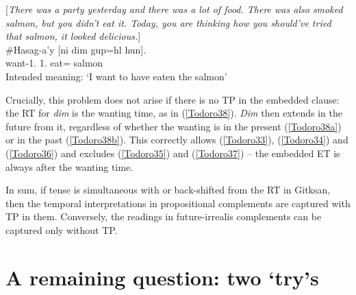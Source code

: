 \documentclass[output=paper]{langscibook}
\begin{document}
\begin{exe}
\ex \label{Todoro37}
\begin{xlist}

\ex \label{Todoro37a} [\emph{There was a party yesterday and there was a lot of food. There   
     was also smoked salmon, but you didn’t eat it. Today, you are thinking how you should’ve tried that salmon, it looked delicious.}]\\
\gll \#{Hasag-a’y}  [{ni}	{dim} 	{gup=hl} 	{hun}].\\
    want-1.{\seriesII}  	1.		eat={\cn}	salmon	\\
\glt Intended meaning: ‘I want to have eaten the salmon’

\ex \label{Todoro37b}

\end{xlist}
\end{exe}

Crucially, this problem does not arise if there is no TP in the embedded clause: the RT for \emph{dim} is the wanting time, as in (\ref{Todoro38}). \emph{Dim} then extends in the future from it, regardless of whether the wanting is in the present (\ref{Todoro38a}) or in the past (\ref{Todoro38b}). This correctly allows (\ref{Todoro33}), (\ref{Todoro34}) and (\ref{Todoro36}) and excludes (\ref{Todoro35}) and (\ref{Todoro37}) – the embedded ET is always after the wanting time.

\begin{exe}
\ex \label{Todoro38}
\begin{xlist}

\ex \label{Todoro38a} 

\ex \label{Todoro38b}

\end{xlist}
\end{exe}

In sum, if tense is simultaneous with or back-shifted from the RT in Gitksan, then the temporal interpretations in propositional complements are captured with TP in them. Conversely, the readings in future-irrealis complements can be captured only without TP.

\section{A remaining question: two ‘try’s}\label{Todoro:sect5}
\end{document}

